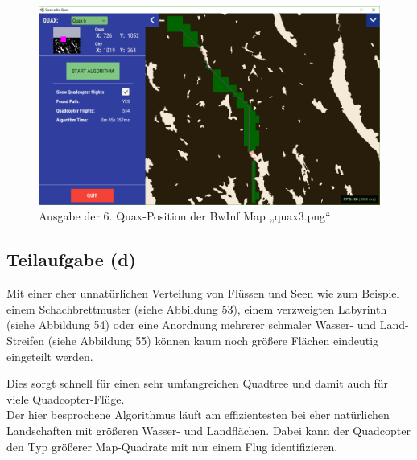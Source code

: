 \documentclass[a4paper,12pt]{article}
\begin{document}
\begin{figure}[H]
\centering
    \includegraphics[width=1\linewidth]{Bilder/Aufgabe3/quax3_06.png}
    \caption{Ausgabe der 6. Quax-Position der BwInf Map „quax3.png“}
\end{figure}

\subsection{Teilaufgabe (d)}
Mit einer eher unnatürlichen Verteilung von Flüssen und Seen wie zum Beispiel einem Schachbrettmuster (siehe Abbildung 53), einem verzweigten Labyrinth (siehe Abbildung 54) oder eine Anordnung mehrerer schmaler Wasser- und Land-Streifen (siehe Abbildung 55) können kaum noch größere Flächen eindeutig eingeteilt werden.

Dies sorgt schnell für einen sehr umfangreichen Quadtree und damit auch für viele Quadcopter-Flüge.
\\[0.4cm]
Der hier besprochene Algorithmus läuft am effizientesten bei eher natürlichen Landschaften mit größeren Wasser- und Landflächen. Dabei kann der Quadcopter den Typ größerer Map-Quadrate mit nur einem Flug identifizieren.
\end{document}
